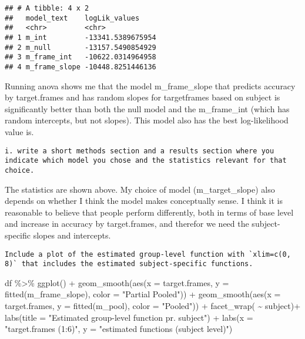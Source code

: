 \documentclass[
]{article}
\newenvironment{Shaded}{\begin{snugshade}}{\end{snugshade}}
\newcommand{\AttributeTok}[1]{\textcolor[rgb]{0.77,0.63,0.00}{#1}}
\newcommand{\FunctionTok}[1]{\textcolor[rgb]{0.00,0.00,0.00}{#1}}
\newcommand{\NormalTok}[1]{#1}
\newcommand{\SpecialCharTok}[1]{\textcolor[rgb]{0.00,0.00,0.00}{#1}}
\newcommand{\StringTok}[1]{\textcolor[rgb]{0.31,0.60,0.02}{#1}}
\begin{document}
\begin{verbatim}
## # A tibble: 4 x 2
##   model_text    logLik_values    
##   <chr>         <chr>            
## 1 m_int         -13341.5389675954
## 2 m_null        -13157.5490854929
## 3 m_frame_int   -10622.0314964958
## 4 m_frame_slope -10448.8251446136
\end{verbatim}

Running anova shows me that the model m\_frame\_slope that predicts
accuracy by target.frames and has random slopes for targetframes based
on subject is significantly better than both the null model and the
m\_frame\_int (which has random intercepts, but not slopes). This model
also has the best log-likelihood value is.

\begin{verbatim}
i. write a short methods section and a results section where you indicate which model you chose and the statistics relevant for that choice. 
\end{verbatim}

The statistics are shown above. My choice of model (m\_target\_slope)
also depends on whether I think the model makes conceptually sense. I
think it is reasonable to believe that people perform differently, both
in terms of base level and increase in accuracy by target.frames, and
therefor we need the subject-specific slopes and intercepts.

\begin{verbatim}
Include a plot of the estimated group-level function with `xlim=c(0, 8)` that includes the estimated subject-specific functions.
\end{verbatim}

\begin{Shaded}
\begin{Highlighting}[]
\NormalTok{df }\SpecialCharTok{\%\textgreater{}\%} 
  \FunctionTok{ggplot}\NormalTok{() }\SpecialCharTok{+}
   \FunctionTok{geom\_smooth}\NormalTok{(}\FunctionTok{aes}\NormalTok{(}\AttributeTok{x =}\NormalTok{ target.frames, }\AttributeTok{y =} \FunctionTok{fitted}\NormalTok{(m\_frame\_slope), }\AttributeTok{color =} \StringTok{"Partial Pooled"}\NormalTok{)) }\SpecialCharTok{+} 
   \FunctionTok{geom\_smooth}\NormalTok{(}\FunctionTok{aes}\NormalTok{(}\AttributeTok{x =}\NormalTok{ target.frames, }\AttributeTok{y =} \FunctionTok{fitted}\NormalTok{(m\_pool), }\AttributeTok{color =} \StringTok{"Pooled"}\NormalTok{)) }\SpecialCharTok{+}
   \FunctionTok{facet\_wrap}\NormalTok{( }\SpecialCharTok{\textasciitilde{}}\NormalTok{ subject)}\SpecialCharTok{+}
   \FunctionTok{labs}\NormalTok{(}\AttributeTok{title =} \StringTok{"Estimated group{-}level function pr. subject"}\NormalTok{) }\SpecialCharTok{+}
   \FunctionTok{labs}\NormalTok{(}\AttributeTok{x =} \StringTok{"target.frames (1:6)"}\NormalTok{, }\AttributeTok{y =} \StringTok{"estimated functions (subject level)"}\NormalTok{)}
\end{Highlighting}
\end{Shaded}
\end{document}
